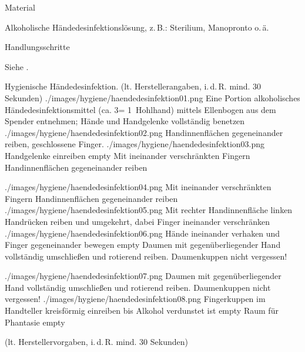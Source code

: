 {Material}
{\begin{compactitem}
    \item Alkoholische Händedesinfektionslösung, z.\,B.:
    Sterilium\texttrademark{}, Manopronto\texttrademark{}
    o.\,ä.
\end{compactitem}}
{}
{}
{}
{}





{Handlungsschritte}
{Siehe .


\begin{PictureSeriesWide}{}{Hygienische Händedesinfektion.  (lt.
Herstellerangaben, i.\,d.\,R. mind. 30 Sekunden)
\label{fig:haendedesinfektion}}
{./images/hygiene/haendedesinfektion01.png}
{Eine Portion alkoholisches
    Händedesinfektionsmittel (ca. 3\Ml* = 1~Hohlhand)
    mittels Ellenbogen aus dem Spen\-der entnehmen; Hände
    und Handgelenke vollständig benetzen}
{./images/hygiene/haendedesinfektion02.png}
{Handinnenflächen gegeneinander reiben, geschlossene Finger.}
{./images/hygiene/haendedesinfektion03.png}
{Handgelenke einreiben}
{empty}
{Mit ineinander verschränkten Fingern Handinnenflächen
    gegeneinander reiben}

{./images/hygiene/haendedesinfektion04.png}
{Mit ineinander verschränkten Fingern Handinnenflächen
    gegeneinander reiben}
{./images/hygiene/haendedesinfektion05.png}
{Mit rechter Handinnenfläche linken Handrücken reiben und
    umgekehrt, dabei Finger ineinander verschränken}
{./images/hygiene/haendedesinfektion06.png}
{Hände ineinander verhaken und Finger gegeneinander bewegen}
{empty}
{Daumen mit gegenüberliegender Hand vollständig umschließen
    und rotierend reiben. Daumenkuppen nicht vergessen!}
    
{./images/hygiene/haendedesinfektion07.png}
{Daumen mit gegenüberliegender Hand vollständig umschließen
    und rotierend reiben. Daumenkuppen nicht vergessen!}
{./images/hygiene/haendedesinfektion08.png}
{Fingerkuppen im Handteller kreisförmig einreiben bis Alkohol
    verdunstet ist}
{empty}
{Raum für Phantasie}
{empty}
{}
\end{PictureSeriesWide}}
{}
{}
{}
{}




 (lt.
Herstellervorgaben, i.\,d.\,R. mind. 30 Sekunden)


